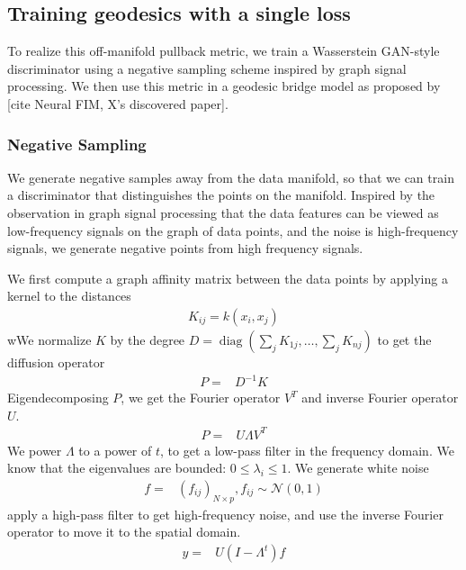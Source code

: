 \documentclass{article}
\theoremstyle{plain}
\theoremstyle{definition}
\theoremstyle{remark}
\begin{document}
\subsection{Training geodesics with a single loss}
To realize this off-manifold pullback metric, we train a Wasserstein GAN-style discriminator using a negative sampling scheme inspired by graph signal processing. We then use this metric in a geodesic bridge model as proposed by [cite Neural FIM, X's discovered paper].

\subsubsection{Negative Sampling}
\par We generate negative samples away from the data manifold, so that we can train a discriminator that distinguishes the points on the manifold. Inspired by the observation in graph signal processing that the data features can be viewed as low-frequency signals on the graph of data points, and the noise is high-frequency signals\cite{leone2023bayesian,van2018recovering}, we generate negative points from high frequency signals.
\par We first compute a graph affinity matrix between the data points by applying a kernel to the distances
\begin{align}
    K_{ij}=k(x_i,x_j)
\end{align}
wWe normalize $K$ by the degree $D=\operatorname{diag}(\sum_{j}K_{1j}, \dots,\sum_{j}K_{nj})$ to get the diffusion operator
\begin{align}
    P=&D^{-1}K
\end{align}
Eigendecomposing $P$, we get the Fourier operator $V^T$ and inverse Fourier operator $U$.
\begin{align}
    P=&U\Lambda V^T
\end{align}
We power $\Lambda$ to a power of $t$, to get a low-pass filter in the frequency domain. We know that  \cite{coifman2006diffusion} the eigenvalues are bounded:
$0\leq\lambda_i\leq 1$. We generate white noise 
\begin{align}
    f=&(f_{ij})_{N\times p},f_{ij}\sim\mathcal N(0,1)
\end{align}
apply a high-pass filter to get high-frequency noise, and use the inverse Fourier operator to move it to the spatial domain.
\begin{align}
    y=&U(I-\Lambda^t) f
\end{align}
\end{document}
